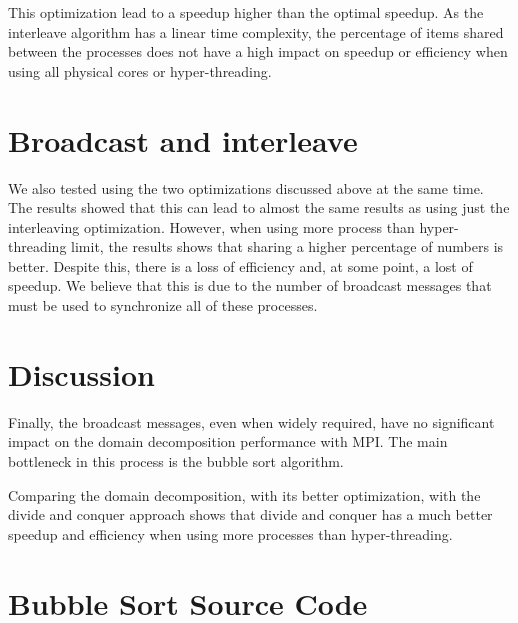 \documentclass[10pt,twocolumn]{article}
\begin{document}
This optimization lead to a speedup higher than the optimal speedup. As the interleave algorithm has a linear time complexity, the percentage of items shared between the processes does not have a high impact on speedup or efficiency when using all physical cores or hyper-threading.


\section*{Broadcast and interleave}

We also tested using the two optimizations discussed above at the same time. The results showed that this can lead to almost the same results as using just the interleaving optimization. However, when using more process than hyper-threading limit, the results shows that sharing a higher percentage of numbers is better. Despite this, there is a loss of efficiency and, at some point, a lost of speedup. We believe that this is due to the number of broadcast messages that must be used to synchronize all of these processes.


\section*{Discussion}

Finally, the broadcast messages, even when widely required, have no significant impact on the domain decomposition performance with MPI. The main bottleneck in this process is the bubble sort algorithm.

Comparing the domain decomposition, with its better optimization, with the divide and conquer approach shows that divide and conquer has a much better speedup and efficiency when using more processes than hyper-threading.


\onecolumn

\section*{Bubble Sort Source Code}




\end{document}
